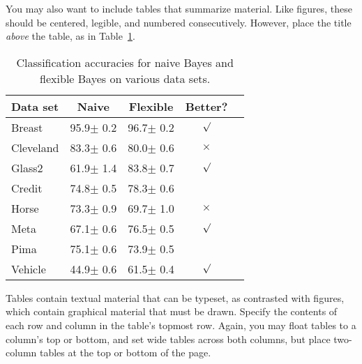 \documentclass{article}
\begin{document}
You may also want to include tables that summarize material. Like 
figures, these should be centered, legible, and numbered consecutively. 
However, place the title {\it above\/} the table, as in 
Table~\ref{sample-table}.

\begin{table}[t]
\caption{Classification accuracies for naive Bayes and flexible 
Bayes on various data sets.}
\label{sample-table}
\vskip 0.15in
\begin{center}
\begin{small}
\begin{sc}
\begin{tabular}{lcccr}
\hline
\abovespace\belowspace
Data set & Naive & Flexible & Better? \\
\hline
\abovespace
Breast    & 95.9$\pm$ 0.2& 96.7$\pm$ 0.2& $\surd$ \\
Cleveland & 83.3$\pm$ 0.6& 80.0$\pm$ 0.6& $\times$\\
Glass2    & 61.9$\pm$ 1.4& 83.8$\pm$ 0.7& $\surd$ \\
Credit    & 74.8$\pm$ 0.5& 78.3$\pm$ 0.6&         \\
Horse     & 73.3$\pm$ 0.9& 69.7$\pm$ 1.0& $\times$\\
Meta      & 67.1$\pm$ 0.6& 76.5$\pm$ 0.5& $\surd$ \\
Pima      & 75.1$\pm$ 0.6& 73.9$\pm$ 0.5&         \\
\belowspace
Vehicle   & 44.9$\pm$ 0.6& 61.5$\pm$ 0.4& $\surd$ \\
\hline
\end{tabular}
\end{sc}
\end{small}
\end{center}
\vskip -0.1in
\end{table}

Tables contain textual material that can be typeset, as contrasted 
with figures, which contain graphical material that must be drawn. 
Specify the contents of each row and column in the table's topmost
row. Again, you may float tables to a column's top or bottom, and set
wide tables across both columns, but place two-column tables at the
top or bottom of the page.
 
\end{document}
